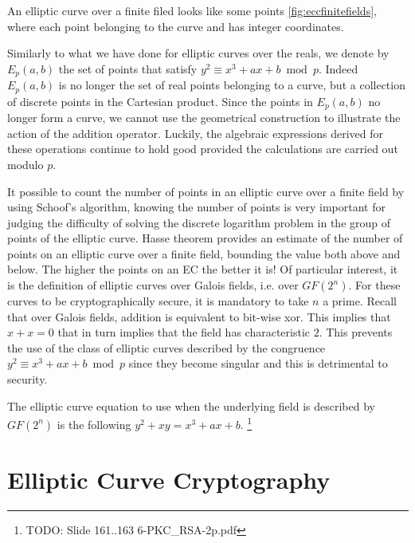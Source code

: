 An elliptic curve over a finite filed looks like some points \ref{fig:eccfinitefields}, where each point belonging to the curve and has integer coordinates.

Similarly to what we have done for elliptic curves over the reals, we denote by $E_p(a,b)$ the set of points that satisfy $y^2 \equiv x^3 + ax +b \bmod{p}$. Indeed $E_p(a,b)$ is no longer the set of real points belonging to a curve, but a collection of discrete points in the Cartesian product. Since the points in $E_p(a,b)$ no longer form a curve, we cannot use the geometrical construction to illustrate the action of the addition operator.
Luckily, the algebraic expressions derived for these operations continue to hold good provided the calculations are carried out modulo $p$.

It possible to count the number of points in an elliptic curve over a finite field by using Schoof's algorithm, knowing the number of points is very important for judging the difficulty of solving the discrete logarithm problem in the group of points of the elliptic curve. Hasse theorem provides an estimate of the number of points on an elliptic curve over a finite field, bounding the value both above and below.  The higher the points on an EC the better it is!
Of particular interest, it is the definition of elliptic curves over Galois fields, i.e. over $GF(2^n)$. For these curves to be cryptographically secure, it is mandatory to take $n$ a prime. Recall that over Galois fields, addition is equivalent to bit-wise xor. This implies that $x+x=0$ that in turn implies that the field has characteristic $2$. This prevents the use of the class of elliptic curves described by the congruence $y^2 \equiv x^3 + ax +b \bmod{p}$ since they become singular and this is detrimental to security.

The elliptic curve equation to use when the underlying field is described by $GF(2^n)$ is the following $y^2 + xy = x^3 + ax + b$. \footnote{TODO: Slide 161..163 6-PKC\_RSA-2p.pdf}



\section{Elliptic Curve Cryptography}

